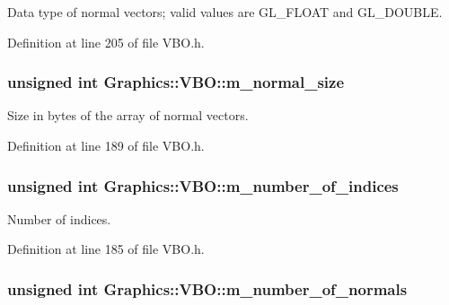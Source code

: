 Data type of normal vectors; valid values are GL\_\-FLOAT and GL\_\-DOUBLE. 



Definition at line 205 of file VBO.h.

\hypertarget{class_graphics_1_1_v_b_o_a57b327ff027f5565d207a6c0d1127f9c}{
\subsubsection[{m\_\-normal\_\-size}]{\setlength{\rightskip}{0pt plus 5cm}unsigned int {\bf Graphics::VBO::m\_\-normal\_\-size}}}
\label{class_graphics_1_1_v_b_o_a57b327ff027f5565d207a6c0d1127f9c}


Size in bytes of the array of normal vectors. 



Definition at line 189 of file VBO.h.

\hypertarget{class_graphics_1_1_v_b_o_a251b1299ea9eb738c398b0f0f61264c7}{
\subsubsection[{m\_\-number\_\-of\_\-indices}]{\setlength{\rightskip}{0pt plus 5cm}unsigned int {\bf Graphics::VBO::m\_\-number\_\-of\_\-indices}}}
\label{class_graphics_1_1_v_b_o_a251b1299ea9eb738c398b0f0f61264c7}


Number of indices. 



Definition at line 185 of file VBO.h.

\hypertarget{class_graphics_1_1_v_b_o_a1c096f3f5c8df8c7688450b70cb0e6cd}{
\subsubsection[{m\_\-number\_\-of\_\-normals}]{\setlength{\rightskip}{0pt plus 5cm}unsigned int {\bf Graphics::VBO::m\_\-number\_\-of\_\-normals}}}
\label{class_graphics_1_1_v_b_o_a1c096f3f5c8df8c7688450b70cb0e6cd}


